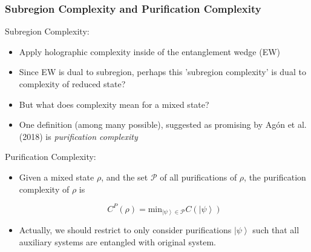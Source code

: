 \documentclass[10pt,aspectratio=169]{beamer}
\newcommand{\ket}[1]{\left| #1 \right>}
\begin{document}
\begin{frame}
\frametitle{Subregion Complexity and Purification Complexity}

Subregion Complexity:

\begin{itemize}

\item Apply holographic complexity inside of the entanglement wedge (EW)

\item Since EW is dual to subregion, perhaps this 'subregion complexity' is dual to complexity of reduced state?

\item But what does complexity mean for a mixed state?

\item One definition (among many possible), suggested as promising by Ag\'on et al. (2018) is {\it purification complexity}

\end{itemize}

Purification Complexity:

\begin{itemize}

\item Given a mixed state $\rho$, and the set $\mathcal{P}$ of all purifications of $\rho$, the purification complexity of $\rho$ is 

$$C^P(\rho) = \text{min}_{\ket{\psi}\in \mathcal{P}} C(\ket{\psi})$$

\item Actually, we should restrict to only consider purifications $\ket{\psi}$ such that all auxiliary systems are entangled with original system.

\end{itemize}

\end{frame}
\end{document}
